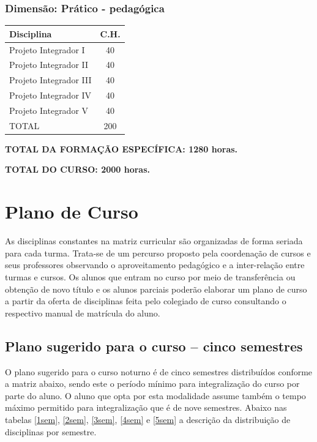 \documentclass[a4paper, 12pt, openright, oneside, german, french, english, brazil]{abntex2}
\begin{document}
\subsubsection{Dimensão: Prático - pedagógica}

\begin{table}[!h]
  \footnotesize
  \centering
  \begin{tabular}{|p{5cm}|c|}
    \hline
    \textbf{Disciplina} & \textbf{C.H.} \\
    \hline
    Projeto Integrador I & 40 \\
    \hline
    Projeto Integrador II & 40 \\
    \hline
    Projeto Integrador III & 40 \\
    \hline
    Projeto Integrador IV & 40 \\
    \hline
    Projeto Integrador V & 40 \\
    \hline
    TOTAL & 200 \\
    \hline
  \end{tabular}
\end{table}

\textbf{TOTAL DA FORMAÇÃO ESPECÍFICA: 1280 horas.}

\textbf{TOTAL DO CURSO: 2000 horas.}

\section{Plano de Curso}

As disciplinas constantes na matriz curricular são organizadas de forma seriada para cada turma. Trata-se de um percurso proposto pela coordenação de cursos e seus professores observando o aproveitamento pedagógico e a inter-relação entre turmas e cursos. Os alunos que entram no curso por meio de transferência ou obtenção de novo título e os alunos parciais poderão elaborar um plano de curso a partir da oferta de disciplinas feita pelo colegiado de curso consultando o respectivo manual de matrícula do aluno.

\subsection{Plano sugerido para o curso -- cinco semestres}

O plano sugerido para o curso noturno é de cinco semestres distribuídos conforme a matriz abaixo, sendo este o período mínimo para integralização do curso por parte do aluno. O aluno que opta por esta modalidade assume também o tempo máximo permitido para integralização que é de nove semestres. Abaixo nas tabelas \ref{1sem}, \ref{2sem}, \ref{3sem}, \ref{4sem} e \ref{5sem} a descrição da distribuição de disciplinas por semestre.
\end{document}
